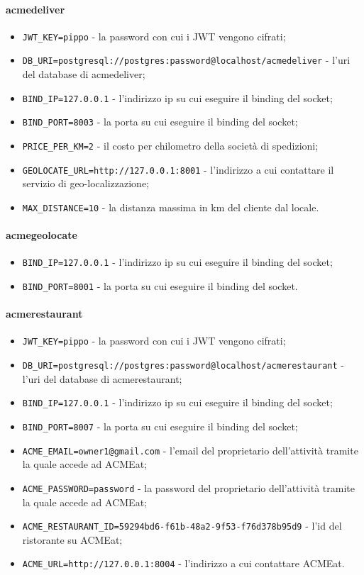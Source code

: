 \documentclass[11pt]{article} %
\begin{document}
\paragraph{acmedeliver}
\begin{itemize}
\item \verb|JWT_KEY=pippo| - la password con cui i JWT vengono cifrati;
\item \verb|DB_URI=postgresql://postgres:password@localhost/acmedeliver| - l'uri del database di acmedeliver;
\item \verb|BIND_IP=127.0.0.1| - l'indirizzo ip su cui eseguire il binding del socket;
\item \verb|BIND_PORT=8003| - la porta su cui eseguire il binding del socket;
\item \verb|PRICE_PER_KM=2| - il costo per chilometro della società di spedizioni;
\item \verb|GEOLOCATE_URL=http://127.0.0.1:8001| - l'indirizzo a cui contattare il servizio di geo-localizzazione;
\item \verb|MAX_DISTANCE=10| - la distanza massima in km del cliente dal locale.
\end{itemize}
\paragraph{acmegeolocate}
\begin{itemize}
\item \verb|BIND_IP=127.0.0.1| - l'indirizzo ip su cui eseguire il binding del socket;
\item \verb|BIND_PORT=8001| - la porta su cui eseguire il binding del socket.
\end{itemize}
\paragraph{acmerestaurant}
\begin{itemize}
\item \verb|JWT_KEY=pippo| - la password con cui i JWT vengono cifrati;
\item \verb|DB_URI=postgresql://postgres:password@localhost/acmerestaurant| - l'uri del database di acmerestaurant;
\item \verb|BIND_IP=127.0.0.1| - l'indirizzo ip su cui eseguire il binding del socket;
\item \verb|BIND_PORT=8007| - la porta su cui eseguire il binding del socket;
\item \verb|ACME_EMAIL=owner1@gmail.com| - l'email del proprietario dell'attività tramite la quale accede ad ACMEat;
\item \verb|ACME_PASSWORD=password| - la password del proprietario dell'attività tramite la quale accede ad ACMEat;
\item \verb|ACME_RESTAURANT_ID=59294bd6-f61b-48a2-9f53-f76d378b95d9| - l'id del ristorante su ACMEat;
\item \verb|ACME_URL=http://127.0.0.1:8004| - l'indirizzo a cui contattare ACMEat.
\end{itemize}
\end{document}

